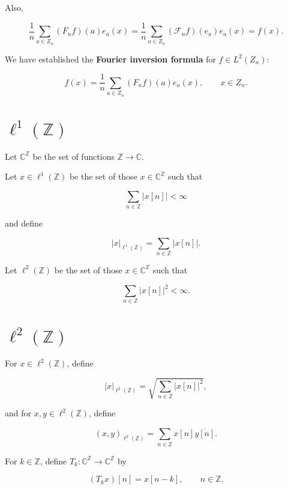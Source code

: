 \documentclass[11pt]{article} %
\begin{document}
Also,

$$
 \frac{1}{n} \sum_{a \in Z_n} (F_n f)(a) e_a(x)
 = \frac{1}{n} \sum_{a \in Z_n} (\mathscr{F}_nf)(e_a)e_a(x)
= f(x).
$$

We have established the \textbf{Fourier inversion formula} for $f \in L^2(Z_n)$:

$$
f(x) = \frac{1}{n} \sum_{a \in Z_n} (F_n f)(a) e_a(x),
\qquad x \in Z_n.
$$

\section{$\ell^1(\mathbb{Z})$}
Let $\mathbb{C}^{\mathbb{Z}}$ be the set of functions $\mathbb{Z} \to \mathbb{C}$.

Let $x \in \ell^1(\mathbb{Z})$ be the set of those $x \in \mathbb{C}^{\mathbb{Z}}$ such that

$$
\sum_{n \in \mathbb{Z}} |x[n]| < \infty
$$

and define

$$
|x|_{\ell^1(\mathbb{Z})} = \sum_{n \in \mathbb{Z}} |x[n]|.
$$

Let $\ell^2(\mathbb{Z})$ be the set of those $x \in \mathbb{C}^{\mathbb{Z}}$ such that

$$
\sum_{n \in \mathbb{Z}} |x[n]|^2 < \infty.
$$

\section{$\ell^2(\mathbb{Z})$}

For $x \in \ell^2(\mathbb{Z})$, define

$$
|x|_{\ell^2(\mathbb{Z})} = \sqrt{\sum_{n \in \mathbb{Z}} |x[n]|^2},
$$

and for $x,y \in \ell^2(\mathbb{Z})$, define

$$
(x,y)_{\ell^2(\mathbb{Z})} = \sum_{n \in \mathbb{Z}} x[n] \overline{y[n]}.
$$

For $k \in \mathbb{Z}$, define $T_k:\mathbb{C}^{\mathbb{Z}} \to \mathbb{C}^{\mathbb{Z}}$ by

$$
(T_kx)[n] = x[n-k],\qquad n \in \mathbb{Z}.
$$






\end{document}
